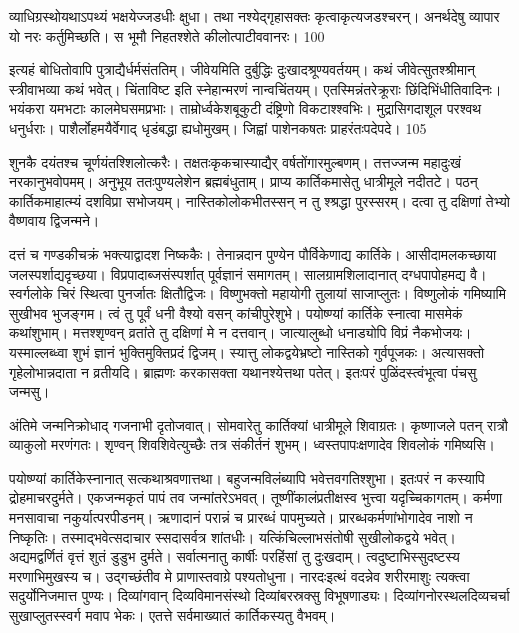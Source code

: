 व्याधिग्रस्थोयथाऽपथ्यं भक्षयेज्जडधीः क्षुधा।
 तथा नश्येद्गृहासक्तः कृत्वाकृत्यजडश्चरन्।
 अनर्थदेषु व्यापार यो नरः कर्तुमिच्छति।
 स भूमौ निहतश्शेते कीलोत्पाटीववानरः।
 100

  इत्यहं बोधितोवापि पुत्राद्यैर्धर्मसंततिम्।
 जीवेयमिति दुर्बुद्धिः दुःखादश्रूण्यवर्तयम्।
 कथं जीवेत्सुतश्श्रीमान् स्त्रीवाभव्या कथं भवेत्।
 चिंताविष्ट इति स्नेहान्मरणं नान्वचिंतयम्।
 एतस्मिन्नंतरेक्रूराः छिंदिभिंधीतिवादिनः।
 भयंकरा यमभटाः कालमेघसमप्रभाः।
 ताम्रोर्ध्वकेशबूकुटी दंष्ट्रिणो विकटाश्श्वभिः।
 मुद्रासिगदाशूल परश्वथ धनुर्धराः।
 पाशैर्लोहमयैर्वेगाद् धृडंबद्धा ह्यधोमुखम्।
 जिह्वां पाशेनकषतः प्राहरंतःपदेपदे।
 105

  शुनकै दयंतश्च चूर्णयंतश्शिलोत्करैः।
 तक्षतःकृकचास्याद्यैर् वर्षतोंगारमुल्बणम्।
 तत्तज्जन्म महादुःखं नरकानुभवोपमम्।
 अनुभूय ततःपुण्यलेशेन ब्रह्मबंधुताम्।
 प्राप्य कार्तिकमासेतु धात्रीमूले नदीतटे।
 पठन् कार्तिकमाहात्म्यं दशविप्रा सभोजयम्।
 नास्तिकोलोकभीतस्सन् न तु श्श्रद्धा पुरस्सरम्।
 दत्वा तु दक्षिणां तेभ्यो वैष्णवाय द्विजन्मने।
 
दत्तं च गण्डकीचक्रं भक्त्याद्वादश निष्ककैः।
 तेनान्नदान पुण्येन पौर्विकेणाद्य कार्तिके।
 आसीदामलकच्छाया जलस्पर्शाद्यदृच्छया।
 विप्रपादाब्जसंस्पर्शात् पूर्वज्ञानं समागतम्।
 सालग्रामशिलादानात् दग्धपापोहमद्य वै।
 स्वर्गलोके चिरं स्थित्वा पुनर्जातः क्षितौद्विजः।
 विष्णुभक्तो महायोगी तुलायां साजाप्लुतः।
 विष्णुलोकं गमिष्यामि सुखीभव भुजङ्गम।
 त्वं तु पूर्वं धनी वैश्यो वसन् कांचीपुरेशुभे।
 पयोष्ण्यां कार्तिके स्नात्वा मासमेकं कथांशुभाम्।
 मत्तश्शृण्वन् व्रतांते तु दक्षिणां मे न दत्तवान्।
 जात्यालुब्धो धनाड्योपि विप्रं नैकभोजयः।
 यस्माल्लब्ध्वा शुभं ज्ञानं भुक्तिमुक्तिप्रदं द्विजम्।
 स्यात्तु लोकद्वयेभ्रष्टो नास्तिको गुर्वपूजकः।
 अत्यासक्तो गृहेलोभान्नदाता न व्रतीयदि।
 ब्राह्मणः करकासक्ता यथानश्येत्तथा पतेत्।
 इतःपरं पुळिंदस्त्वंभूत्वा पंचसु जन्मसु।
 
अंतिमे जन्मनिक्रोधाद् गजनाभी दृतोजवात्।
 सोमवारेतु कार्तिक्यां धात्रीमूले शिवाग्रतः।
 कृष्णाजले पतन् रात्रौ व्याकुलो मरणंगतः।
 शृण्वन् शिवशिवेत्युच्छैः तत्र संकीर्तनं शुभम्।
 ध्वस्तपापःक्षणादेव शिवलोकं गमिष्यसि।
 
पयोष्ण्यां कार्तिकेस्नानात् सत्कथाश्रवणात्तथा।
 बहुजन्मविलंब्यापि भवेत्तवगतिश्शुभा।
 इतःपरं न कस्यापि द्रोहमाचरदुर्मते।
 एकजन्मकृतं पापं तव जन्मांतरेऽभवत्।
 तूष्णींकालंप्रतीक्षस्व भुत्त्वा यदृच्चिकागतम्।
 कर्मणा मनसावाचा नकुर्यात्परपीडनम्।
 ऋणादानं परान्नं च प्रारब्धं पापमुच्यते।
 प्रारब्धकर्मणांभोगादेव नाशो न निष्कृतिः।
 तस्माद्भवेत्सदाचार स्सदासर्वत्र शांतधीः।
 यत्किंचिल्लाभसंतोषी सुखीलोकद्वये भवेत्।
 अद्यमद्वर्णितं वृत्तं शुतं डुडुभ दुर्मते।
 सर्वात्मनातु कार्षीः परहिंसां तु दुःखदाम्।
 त्वदुष्टाभिस्सुदष्टस्य मरणाभिमुखस्य च।
 उद्गच्छंतीव मे प्राणास्तवाग्रे पश्यतोधुना।
 नारदःइत्थं वदन्नेव शरीरमाशुः त्यक्त्वा
सदुर्योनिजमात्त पुण्यः।
 दिव्यांगवान् दिव्यविमानसंस्थो
दिव्यांबरस्रक्सु विभूषणाड्यः।
 दिव्यांगनोरस्थलदिव्यचर्चा
सुखाप्लुतस्स्वर्ग मवाप भेकः।
 एतत्ते सर्वमाख्यातं कार्तिकस्यतु वैभवम्।
 

